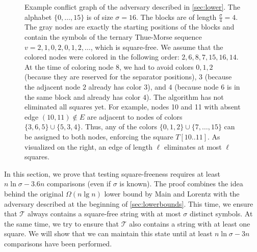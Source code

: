 \begin{figure}
\caption{Example conflict graph of the adversary described in \cref{sec:lower}. 
The alphabet $\{0, \dots, 15\}$ is of size $\sigma = 16$. 
The blocks are of length $\frac \sigma 4 = 4$. 
The gray nodes are exactly the starting positions of the blocks and contain the symbols of the ternary Thue-Morse sequence $v = 2,1,0,2,0,1,2,\dots$, which is square-free. 
We assume that the colored nodes were colored in the following order: $2,6,8,7,15,16,14$. 
At the time of coloring node $8$, we had to avoid colors 
$0,1,2$ (because they are reserved for the separator positions), 
$3$ (because the adjacent node $2$ already has color $3$), and 
$4$ (because node $6$ is in the same block and already has color $4$). 
The algorithm has not eliminated all squares yet. 
For example, nodes 10 and 11 with absent edge $(10, 11) \notin E$ are adjacent to nodes of colors $\{3,6,5\} \cup \{5,3,4\}$. 
Thus, any of the colors $\{0,1,2\} \cup \{7, \dots, 15\}$ can be assigned to both nodes, enforcing the square $T[10..11]$. 
As visualized on the right, an edge of length $\ell$ eliminates at most $\ell$ squares.} 
\label{fig:lbsquarefree}
\end{figure}

In this section, we prove that testing square-freeness requires at least $n \ln \sigma - 3.6n$ comparisons (even if $\sigma$ is known). 
The proof combines the idea behind the original $\Omega(n \lg n)$ lower bound by Main and Lorentz \cite{Main1984} with the adversary described at the beginning of \cref{sec:lowerbounds}.
This time, we ensure that $\mathcal T$ always contains a square-free string with at most $\sigma$ distinct symbols.
At the same time, we try to ensure that $\mathcal T$ also contains a string with at least one square.
We will show that we can maintain this state until at least $n \ln \sigma -3n$ comparisons have been performed.

